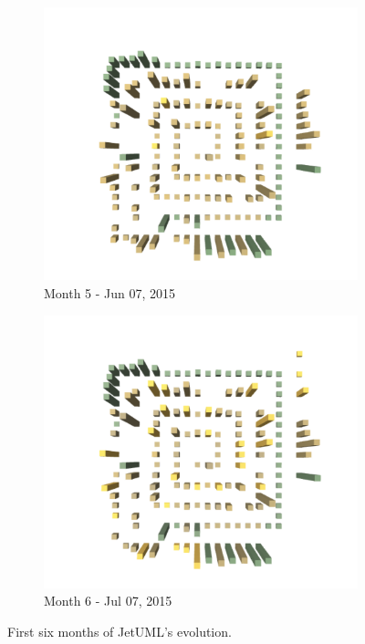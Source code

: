 \begin{figure}[ht]
    \medskip
    \begin{subfigure}{0.48\textwidth}
        \includegraphics[width=\linewidth]{JetUML_V1S5.png}
        \caption{Month 5 - Jun 07, 2015} \label{fig:JetUML_V1S5}
    \end{subfigure}\hspace*{\fill}
    \begin{subfigure}{0.48\textwidth}
        \includegraphics[width=\linewidth]{JetUML_V1S6.png}
        \caption{Month 6 - Jul 07, 2015} \label{fig:JetUML_V1S6}
    \end{subfigure}
    
    \caption{First six months of JetUML's evolution.} 
    \label{fig:JetUML_V1}
\end{figure}
\clearpage
